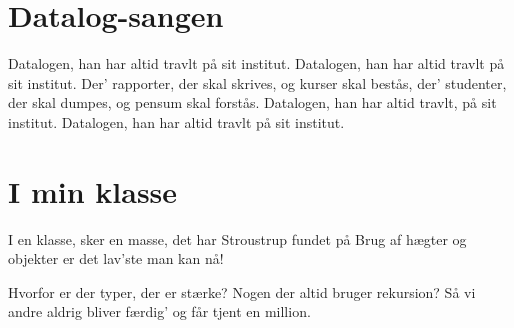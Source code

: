 \documentclass[10pt]{article}
\begin{document}
\section*{Datalog-sangen}%
\begin{song}
Datalogen, han har altid travlt
på sit institut.
Datalogen, han har altid travlt
på sit institut.
Der' rapporter, der skal skrives,
og kurser skal bestås,
der' studenter, der skal dumpes,
og pensum skal forstås.
Datalogen, han har altid travlt,
på sit institut.
Datalogen, han har altid travlt
på sit institut.
\end{song}


\section*{I min klasse}%
\begin{song}
I en klasse, sker en masse, 
det har Stroustrup fundet på
Brug af hægter og objekter
er det lav'ste man kan nå! 

Hvorfor er der typer, der er stærke?
Nogen der altid bruger rekursion?
Så vi andre aldrig bliver færdig'
og får tjent en million.
\end{song}
\end{document}
